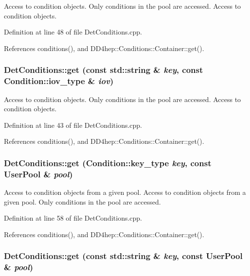 Access to condition objects. Only conditions in the pool are accessed. Access to condition objects. 

Definition at line 48 of file DetConditions.cpp.

References conditions(), and DD4hep::Conditions::Container::get().\hypertarget{class_d_d4hep_1_1_conditions_1_1_det_conditions_a0bb1e77e051b8fc167a54dadbed90ca1}{
\subsubsection[{get}]{ DetConditions::get (const std::string \& {\em key}, \/  const {\bf Condition::iov\_\-type} \& {\em iov})}}
\label{class_d_d4hep_1_1_conditions_1_1_det_conditions_a0bb1e77e051b8fc167a54dadbed90ca1}


Access to condition objects. Only conditions in the pool are accessed. Access to condition objects. 

Definition at line 43 of file DetConditions.cpp.

References conditions(), and DD4hep::Conditions::Container::get().\hypertarget{class_d_d4hep_1_1_conditions_1_1_det_conditions_a4c19cc72b89329e39cd0123229cba3d0}{
\subsubsection[{get}]{ DetConditions::get ({\bf Condition::key\_\-type} {\em key}, \/  const {\bf UserPool} \& {\em pool})}}
\label{class_d_d4hep_1_1_conditions_1_1_det_conditions_a4c19cc72b89329e39cd0123229cba3d0}


Access to condition objects from a given pool. Access to condition objects from a given pool. Only conditions in the pool are accessed. 

Definition at line 58 of file DetConditions.cpp.

References conditions(), and DD4hep::Conditions::Container::get().\hypertarget{class_d_d4hep_1_1_conditions_1_1_det_conditions_aae12a60c145a9aee9dc098db5fd8eb7b}{
\subsubsection[{get}]{ DetConditions::get (const std::string \& {\em key}, \/  const {\bf UserPool} \& {\em pool})}}
\label{class_d_d4hep_1_1_conditions_1_1_det_conditions_aae12a60c145a9aee9dc098db5fd8eb7b}


